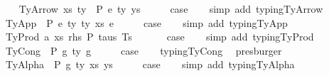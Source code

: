 \begin{isabellebody}
\isamarkupfalse%
\isanewline
\ \ \isamarkupfalse%
\ {\isacharparenleft}{\kern0pt}TyArrow\ xs\ ty{}\ {\isasymGamma}\ P\ e\ ty{}\ ys{\isacharparenright}{\kern0pt}\isanewline
\ \ \isamarkupfalse%
\ \isamarkupfalse%
\ {\isacharquery}{\kern0pt}case\isanewline
\ \ \isamarkupfalse%
\ {\isacharparenleft}{\kern0pt}simp\ add{\isacharcolon}{\kern0pt}\ typing{\isachardot}{\kern0pt}TyArrow{\isacharparenright}{\kern0pt}\isanewline
{}\isamarkupfalse%
\isanewline
\ \ \isamarkupfalse%
\ {\isacharparenleft}{\kern0pt}TyApp\ {\isasymGamma}\ P\ e{}\ ty{}\ ty{}\ xs\ e{}{\isacharparenright}{\kern0pt}\isanewline
\ \ \isamarkupfalse%
\ \isamarkupfalse%
\ {\isacharquery}{\kern0pt}case\isanewline
\ \ \isamarkupfalse%
\ {\isacharparenleft}{\kern0pt}simp\ add{\isacharcolon}{\kern0pt}\ typing{\isachardot}{\kern0pt}TyApp{\isacharparenright}{\kern0pt}\isanewline
{}\isamarkupfalse%
\isanewline
\ \ \isamarkupfalse%
\ {\isacharparenleft}{\kern0pt}TyProd\ a\ xs\ rhs\ P\ taus\ Ts\ {\isasymGamma}{\isacharparenright}{\kern0pt}\isanewline
\ \ \isamarkupfalse%
\ \isamarkupfalse%
\ {\isacharquery}{\kern0pt}case\isanewline
\ \ \isamarkupfalse%
\ {\isacharparenleft}{\kern0pt}simp\ add{\isacharcolon}{\kern0pt}\ typing{\isachardot}{\kern0pt}TyProd{\isacharparenright}{\kern0pt}\isanewline
{}\isamarkupfalse%
\isanewline
\ \ \isamarkupfalse%
\ {\isacharparenleft}{\kern0pt}TyCong\ {\isasymGamma}\ P\ g{}\ ty\ g{}{\isacharparenright}{\kern0pt}\isanewline
\ \ \isamarkupfalse%
\ \isamarkupfalse%
\ {\isacharquery}{\kern0pt}case\isanewline
\ \ \isamarkupfalse%
\ typing{\isachardot}{\kern0pt}TyCong\ \isamarkupfalse%
\ presburger\isanewline
{}\isamarkupfalse%
\isanewline
\ \ \isamarkupfalse%
\ {\isacharparenleft}{\kern0pt}TyAlpha\ {\isasymGamma}{}\ P\ g\ ty\ xs\ ys{\isacharparenright}{\kern0pt}\isanewline
\ \ \isamarkupfalse%
\ \isamarkupfalse%
\ {\isacharquery}{\kern0pt}case\isanewline
\ \ \isamarkupfalse%
\ {\isacharparenleft}{\kern0pt}simp\ add{\isacharcolon}{\kern0pt}\ typing{\isachardot}{\kern0pt}TyAlpha{\isacharparenright}{\kern0pt}\isanewline

\end{isabellebody}
